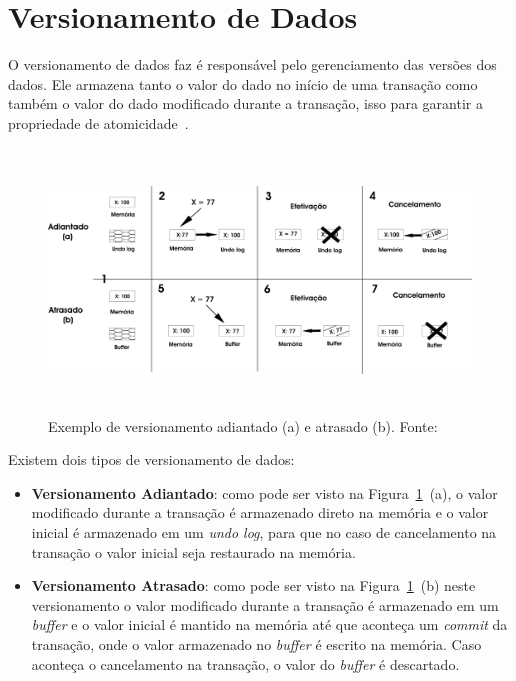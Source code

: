 \documentclass[ti]{texufpel}
\begin{document}
\section{Versionamento de Dados}

O versionamento de dados faz é responsável pelo gerenciamento das versões dos dados. Ele armazena tanto o valor do dado no início de uma transação como também o valor do dado modificado durante a transação, isso para garantir a propriedade de atomicidade~\cite{baldassinTese09}.

\begin{figure}[!htp]
\centering
\includegraphics[height=7cm]{Imagens/versionamento.png}
\caption{Exemplo de versionamento adiantado (a) e atrasado (b). Fonte:~\cite{baldassinTese09}}
\label{figuraVersionamento}
\end{figure}

Existem dois tipos de versionamento de dados:

\begin{itemize}
\item \textbf{Versionamento Adiantado}: como pode ser visto na Figura~\ref{figuraVersionamento}~(a), o valor modificado durante a transação é armazenado direto na memória e o valor inicial é armazenado em um \emph{undo log}, para que no caso de cancelamento na transação o valor inicial seja restaurado na memória.

\item \textbf{Versionamento Atrasado}: como pode ser visto na Figura~\ref{figuraVersionamento}~(b) neste versionamento o valor modificado durante a transação é armazenado em um \emph{buffer} e o valor inicial é mantido na memória até que aconteça um \emph{commit} da transação, onde o valor armazenado no \emph{buffer} é escrito na memória. Caso aconteça o cancelamento na transação, o valor do \emph{buffer} é descartado.
\end{itemize}
\end{document}

